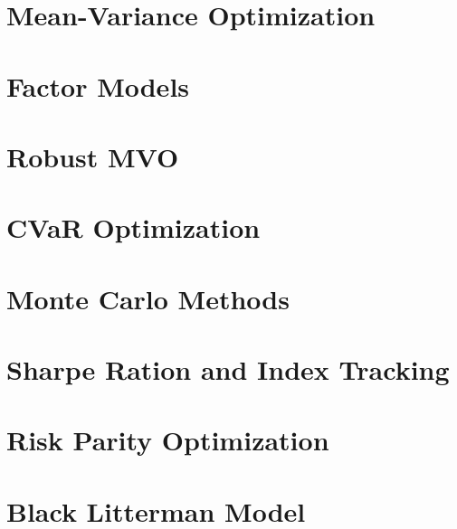 \documentclass[11pt]{article}
\begin{document}
\pagebreak
\section{Mean-Variance Optimization}
\section{Factor Models}
\section{Robust MVO}
\section{CVaR Optimization}
\section{Monte Carlo Methods}
\section{Sharpe Ration and Index Tracking}
\section{Risk Parity Optimization}
\section{Black Litterman Model}
\end{document}
